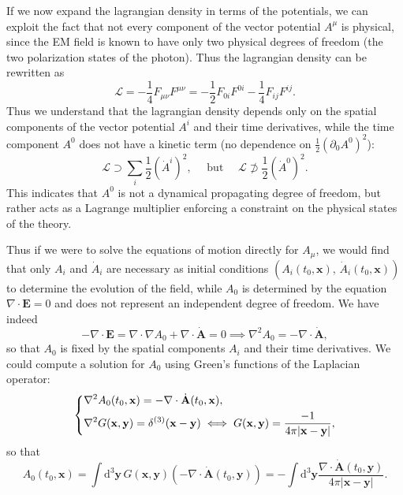 If we now expand the lagrangian density in terms of the potentials, we can exploit the fact that not every component of the vector potential \(A^{\mu}\) is physical, since the EM field is known to have only two physical degrees of freedom (the two polarization states of the photon). Thus the lagrangian density can be rewritten as
\[
    \mathcal{L} = -\frac{1}{4} F_{\mu \nu} F^{\mu \nu} = -\frac{1}{2} F_{0i}F^{0i} - \frac{1}{4} F_{ij}F^{ij}.
\]
Thus we understand that the lagrangian density depends only on the spatial components of the vector potential \(A^i\) and their time derivatives, while the time component \(A^0\) does not have a kinetic term (no dependence on \(\frac{1}{2}(\partial_0 A^0)^2\)):
\[
    \mathcal{L} \supset \sum_{i} \frac{1}{2}(\dot{A}^{i})^2, \quad \text{ but } \quad \mathcal{L} \not\supset \frac{1}{2}(\dot{A}^{0})^2.
\]
This indicates that \(A^0\) is not a dynamical propagating degree of freedom, but rather acts as a Lagrange multiplier enforcing a constraint on the physical states of the theory.

Thus if we were to solve the equations of motion directly for \(A_\mu\), we would find that only \(A_i\) and \(\dot{A}_i\) are necessary as initial conditions \((A_i(t_0, \mathbf{x}),\,\dot{A}_i(t_0, \mathbf{x}))\) to determine the evolution of the field, while \(A_0\) is determined by the equation \(\nabla\cdot \mathbf{E}=0\) and does not represent an independent degree of freedom. We have indeed
\[
    - \nabla\cdot \mathbf{E} = \nabla\cdot\nabla A_0 + \nabla\cdot \dot{\mathbf{A}} = 0 \implies \nabla^2 A_0 = - \nabla\cdot \dot{\mathbf{A}},
\]
so that \(A_0\) is fixed by the spatial components \(A_i\) and their time derivatives. We could compute a solution for \(A_0\) using Green's functions of the Laplacian operator:
\[
    \begin{dcases}
        \nabla^2 A_0(t_0, \mathbf{x}) = - \nabla \cdot \dot{\mathbf{A}}(t_0, \mathbf{x}), \\
        \nabla^2 G(\mathbf{x}, \mathbf{y}) = \delta^{(3)}(\mathbf{x} - \mathbf{y}) \iff G(\mathbf{x}, \mathbf{y}) = \frac{-1}{4\pi \vert \mathbf{x} - \mathbf{y} \vert},
    \end{dcases}
\]
so that
\[
    A_0(t_0, \mathbf{x}) = \int \mathrm{d}^3 \mathbf{y} \, G(\mathbf{x}, \mathbf{y}) \left(- \nabla \cdot \dot{\mathbf{A}}(t_0, \mathbf{y})\right) = - \int \mathrm{d}^3 \mathbf{y} \frac{\nabla \cdot \dot{\mathbf{A}}(t_0, \mathbf{y})}{4\pi \vert \mathbf{x} - \mathbf{y} \vert}.
\]

